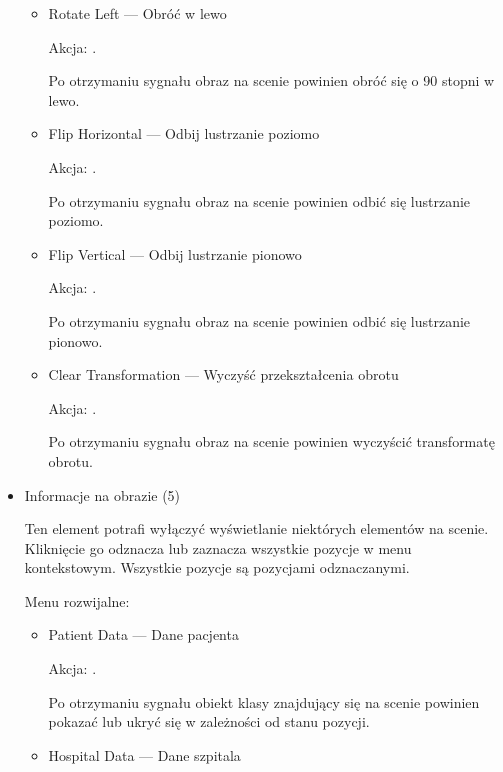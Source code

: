 \begin{itemize}
\begin{itemize}
              \item Rotate Left --- Obróć w lewo

                    Akcja: .

                    Po otrzymaniu sygnału obraz na scenie powinien obróć się o 90 stopni w lewo.

              \item Flip Horizontal --- Odbij lustrzanie poziomo

                    Akcja: .

                    Po otrzymaniu sygnału obraz na scenie powinien odbić się lustrzanie poziomo.

              \item Flip Vertical --- Odbij lustrzanie pionowo

                    Akcja: .

                    Po otrzymaniu sygnału obraz na scenie powinien odbić się lustrzanie pionowo.

              \item Clear Transformation --- Wyczyść przekształcenia obrotu

                    Akcja: .

                    Po otrzymaniu sygnału obraz na scenie powinien wyczyścić transformatę obrotu.

          \end{itemize}
    \item Informacje na obrazie (5)

          Ten element potrafi wyłączyć wyświetlanie niektórych elementów na scenie.
          Kliknięcie go odznacza lub zaznacza wszystkie pozycje w menu kontekstowym.
          Wszystkie pozycje są pozycjami odznaczanymi.

          Menu rozwijalne:
          \begin{itemize}
              \item Patient Data --- Dane pacjenta

                    Akcja: .

                    Po otrzymaniu sygnału obiekt klasy  znajdujący się na scenie powinien pokazać lub ukryć się w zależności od stanu pozycji.

              \item Hospital Data --- Dane szpitala


\end{itemize}
\end{itemize}
